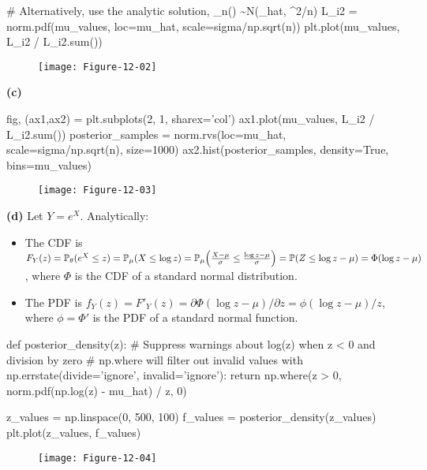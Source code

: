 \begin{python}
# Alternatively, use the analytic solution, _{n}(\mu) \sim N(\mu_hat, \sigma^{2}/n)
L_i2 = norm.pdf(mu_values, loc=mu_hat, scale=sigma/np.sqrt(n))
plt.plot(mu_values, L_i2 / L_i2.sum())
\end{python}

\begin{figure}[H]
\centering
\texttt{[image: Figure-12-02]}
\end{figure}

\textbf{(c)}

\begin{python}
fig, (ax1,ax2) = plt.subplots(2, 1, sharex='col')
ax1.plot(mu_values, L_i2 / L_i2.sum())
posterior_samples = norm.rvs(loc=mu_hat, scale=sigma/np.sqrt(n), size=1000)
ax2.hist(posterior_samples, density=True, bins=mu_values)
\end{python}

\begin{figure}[H]
\centering
\texttt{[image: Figure-12-03]}
\end{figure}

\textbf{(d)}
Let \(Y = e^X\). Analytically:
\begin{itemize}[tightlist]
\item
  The CDF is
  \(F_Y(z) = \PROB_\theta(e^X \leq z) = \PROB_\mu(X \leq \log z) = \PROB_\mu \left( \frac{X - \mu}{\sigma} \leq \frac{\log z - \mu}{\sigma} \right) = \PROB(Z \leq \log z - \mu) = \Phi(\log z - \mu)\),
  where \(\Phi\) is the CDF of a standard normal distribution.
\item
  The PDF is
  \(f_Y(z) = F'_Y(z) = \partial \Phi(\log z - \mu) / \partial z = \phi(\log z - \mu) / z\),
  where \(\phi = \Phi'\) is the PDF of a standard normal function.
\end{itemize}

\begin{python}
def posterior_density(z):
    # Suppress warnings about log(z) when z < 0 and division by zero 
    # np.where will filter out invalid values
    with np.errstate(divide='ignore', invalid='ignore'):
        return np.where(z > 0, norm.pdf(np.log(z) - mu_hat) / z, 0)
    
z_values = np.linspace(0, 500, 100)
f_values = posterior_density(z_values)
plt.plot(z_values, f_values)
\end{python}

\begin{figure}[H]
\centering
\texttt{[image: Figure-12-04]}
\end{figure}


